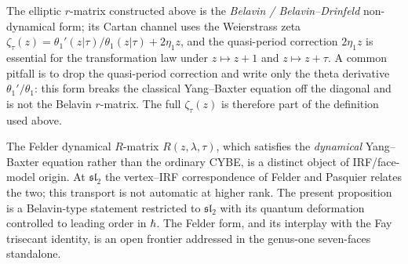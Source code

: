 \begin{remark}
\label{rem:elliptic-rmatrix-scope}
The elliptic $r$-matrix constructed above is the
\emph{Belavin / Belavin--Drinfeld} non-dynamical form; its Cartan
channel uses the Weierstrass zeta
$\zeta_\tau(z) = \theta_1'(z|\tau)/\theta_1(z|\tau) + 2\eta_1 z$,
and the quasi-period correction $2\eta_1 z$ is essential for the
transformation law under $z \mapsto z+1$ and $z \mapsto z+\tau$.
A common pitfall is to drop the quasi-period correction and write
only the theta derivative $\theta_1'/\theta_1$: this form breaks the
classical Yang--Baxter equation off the diagonal and is not the
Belavin $r$-matrix. The full $\zeta_\tau(z)$ is therefore part of the
definition used above.

The Felder dynamical $R$-matrix $R(z, \lambda, \tau)$, which satisfies
the \emph{dynamical} Yang--Baxter equation rather than the ordinary
CYBE, is a distinct object of IRF/face-model origin. At
$\mathfrak{sl}_2$ the vertex--IRF correspondence of Felder and
Pasquier relates the two; this transport is not automatic at higher
rank. The present proposition is a Belavin-type statement
restricted to $\mathfrak{sl}_2$ with its quantum deformation
controlled to leading order in $\hbar$. The Felder form, and its
interplay with the Fay trisecant identity, is an open frontier
addressed in the genus-one seven-faces standalone.
\end{remark}


